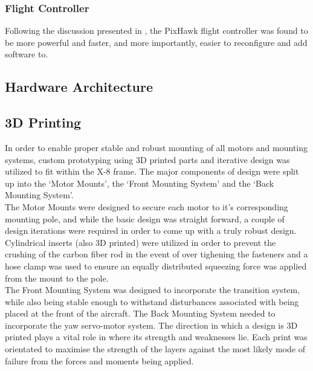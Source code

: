 \subsubsection*{Flight Controller}
Following the discussion presented in \cite{ref:controller_comparison}, the PixHawk flight controller was found to be more powerful and faster, and more importantly, easier to reconfigure and add software to.

\subsection{Hardware Architecture}

\subsection{3D Printing}
In order to enable proper stable and robust mounting of all motors and mounting systems, custom prototyping using 3D printed parts and iterative design was utilized to fit within the X-8 frame. The major components of design were split up into the `Motor Mounts', the `Front  Mounting System' and the `Back Mounting System'.\\

The Motor Mounts were designed to secure each motor to it's corresponding mounting pole, and while the basic design was straight forward, a couple of design iterations were required in order to come up with a truly robust design. Cylindrical inserts (also 3D printed) were utilized in order to prevent the crushing of the carbon fiber rod in the event of over tighening the fasteners and a hose clamp was used to ensure an equally distributed squeezing force was applied from the mount to the pole.\\

The Front Mounting System was designed to incorporate the transition system, while also being stable enough to withstand disturbances associated with being placed at the front of the aircraft.
The Back Mounting System needed to incorporate the yaw servo-motor system. The direction in which a design is 3D printed plays a vital role in where its strength and weaknesses lie. Each print was orientated to maximise the strength of the layers against the most likely mode of failure from the forces and moments being applied.\\

